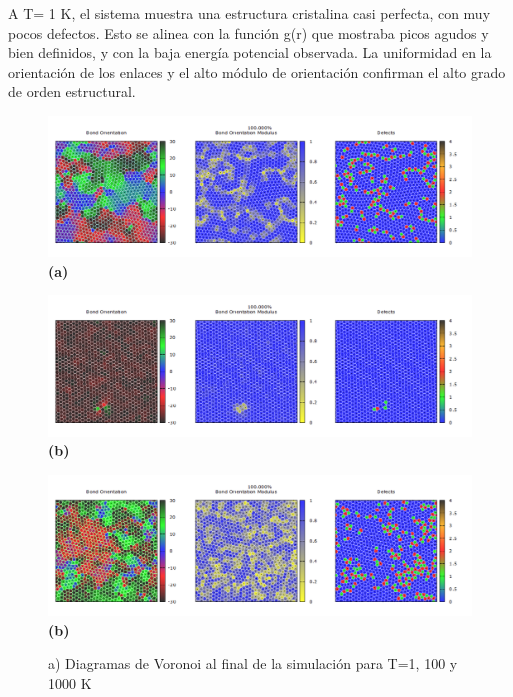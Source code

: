 A T= 1 K, el sistema muestra una estructura cristalina casi perfecta, con muy pocos defectos. Esto se alinea con la función g(r) que mostraba picos agudos y bien definidos, y con la baja energía potencial observada. La uniformidad en la orientación de los enlaces y el alto módulo de orientación confirman el alto grado de orden estructural.

\begin{figure}[H]
	\centering
	\begin{minipage}[b]{0.9\textwidth} %
		\centering
		\includegraphics[width=1\textwidth]{grafico_3x19_voronoi_T1.png}
		\textbf{(a)}
	\end{minipage}
	
	\begin{minipage}[b]{0.9\textwidth} %
		\centering
		\includegraphics[width=1\textwidth]{grafico_3x20_voronoi_T100.png}
		\textbf{(b)}
	\end{minipage}
	
	\begin{minipage}[b]{0.9\textwidth} %
		\centering
		\includegraphics[width=1\textwidth]{grafico_3x21_voronoi_T1000.png}
		\textbf{(b)}
	\end{minipage}
	
	\caption{\footnotesize a) Diagramas de Voronoi al final de la simulación para T=1, 100 y 1000 K}
	\label{fig:voronoi}
\end{figure}



